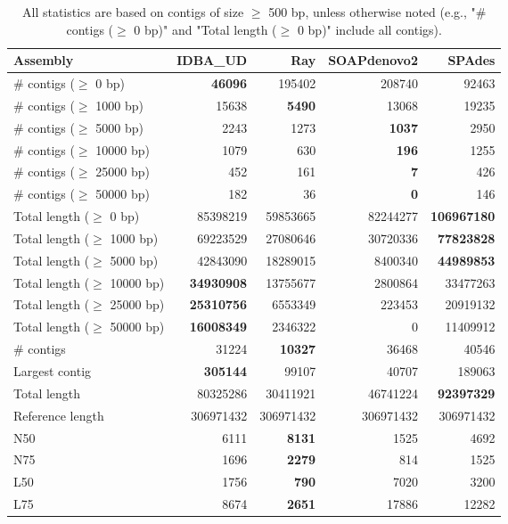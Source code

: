 \documentclass[12pt,a4paper]{article}
\begin{document}
\begin{table}[ht]
\begin{center}
\caption{All statistics are based on contigs of size $\geq$ 500 bp, unless otherwise noted (e.g., "\# contigs ($\geq$ 0 bp)" and "Total length ($\geq$ 0 bp)" include all contigs).}
\begin{tabular}{|l*{4}{|r}|}
\hline
Assembly & IDBA\_UD & Ray & SOAPdenovo2 & SPAdes \\ \hline
\# contigs ($\geq$ 0 bp) & {\bf 46096} & 195402 & 208740 & 92463 \\ \hline
\# contigs ($\geq$ 1000 bp) & 15638 & {\bf 5490} & 13068 & 19235 \\ \hline
\# contigs ($\geq$ 5000 bp) & 2243 & 1273 & {\bf 1037} & 2950 \\ \hline
\# contigs ($\geq$ 10000 bp) & 1079 & 630 & {\bf 196} & 1255 \\ \hline
\# contigs ($\geq$ 25000 bp) & 452 & 161 & {\bf 7} & 426 \\ \hline
\# contigs ($\geq$ 50000 bp) & 182 & 36 & {\bf 0} & 146 \\ \hline
Total length ($\geq$ 0 bp) & 85398219 & 59853665 & 82244277 & {\bf 106967180} \\ \hline
Total length ($\geq$ 1000 bp) & 69223529 & 27080646 & 30720336 & {\bf 77823828} \\ \hline
Total length ($\geq$ 5000 bp) & 42843090 & 18289015 & 8400340 & {\bf 44989853} \\ \hline
Total length ($\geq$ 10000 bp) & {\bf 34930908} & 13755677 & 2800864 & 33477263 \\ \hline
Total length ($\geq$ 25000 bp) & {\bf 25310756} & 6553349 & 223453 & 20919132 \\ \hline
Total length ($\geq$ 50000 bp) & {\bf 16008349} & 2346322 & 0 & 11409912 \\ \hline
\# contigs & 31224 & {\bf 10327} & 36468 & 40546 \\ \hline
Largest contig & {\bf 305144} & 99107 & 40707 & 189063 \\ \hline
Total length & 80325286 & 30411921 & 46741224 & {\bf 92397329} \\ \hline
Reference length & 306971432 & 306971432 & 306971432 & 306971432 \\ \hline
N50 & 6111 & {\bf 8131} & 1525 & 4692 \\ \hline
N75 & 1696 & {\bf 2279} & 814 & 1525 \\ \hline
L50 & 1756 & {\bf 790} & 7020 & 3200 \\ \hline
L75 & 8674 & {\bf 2651} & 17886 & 12282 \\ \hline

\end{tabular}
\end{center}
\end{table}
\end{document}
